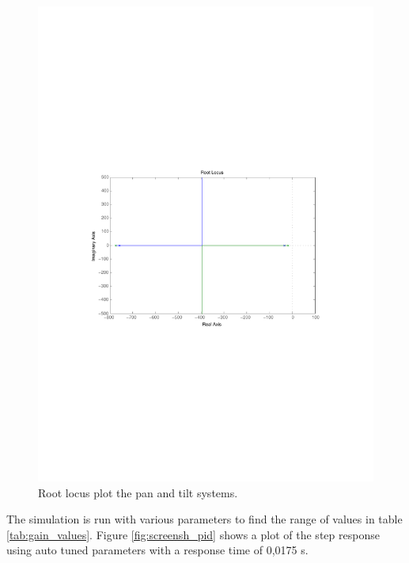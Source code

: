 \begin{figure}[htb]
	\centering
	\includegraphics[width=\textwidth,clip,trim=80 270 80 270]{graphics/rlocus_plot.pdf} %
	\caption{Root locus plot the pan and tilt systems.}
	\label{fig:rlocus_plot}			
\end{figure}

The simulation is run with various parameters to find the range of values in table \ref{tab:gain_values}. Figure \ref{fig:screensh_pid} shows a plot of the step response using auto tuned parameters with a response time of 0,0175 s.

